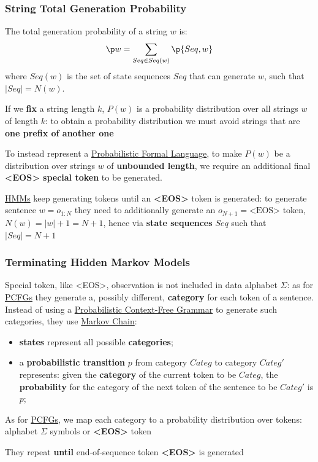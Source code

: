 \subsubsection{String Total Generation Probability}\label{} %
The total generation probability of a string $w$ is:
\[
    \p w = \sum_{Seq\in Seq(w)}\p{Seq,w}
\]
where $Seq(w)$ is the set of state sequences $Seq$ that can generate $w$, such that $|Seq| = N(w)$.
\begin{note}
    If we \textbf{fix} a string length $k$, $P(w)$ is a probability distribution over all strings $w$ of length $k$: to obtain a probability distribution we must avoid strings that are \textbf{one prefix of another one}
\end{note}
To instead represent a \hyperref[def:pfl]{Probabilistic Formal Language}, to make $P(w)$ be a distribution over strings $w$ of \textbf{unbounded length}, we require an additional final \textbf{<EOS> special token} to be generated.
\begin{note}
    \hyperref[sub:lm_hmm]{HMMs} keep generating tokens until an \textbf{<EOS>} token is generated: to generate sentence $w = o_{1:N}$ they need to additionally generate an $o_{N+1} = \text{<EOS>}$ token, $N(w) = |w|+1 = N+1$, hence via \textbf{state sequences} $Seq$ such that $|Seq| = N+1$
\end{note}
%
\subsubsection{Terminating Hidden Markov Models}\label{sub:lm_terminating_hidden_markov_models} %
Special token, like <EOS>, observation is not included in data alphabet $\Sigma$: as for \hyperref[def:pcfg]{PCFGs} they generate a, possibly different, \textbf{category} for each token of a sentence.
Instead of using a \hyperref[def:pcfg]{Probabilistic Context-Free Grammar} to generate such categories, they use \hyperref[def:markov-chain]{Markov Chain}:
\begin{itemize}
    \item \textbf{states} represent all possible \textbf{categories};
    \item a \textbf{probabilistic transition} $p$ from category $Categ$ to category $Categ'$ represents: given the \textbf{category} of the current token to be $Categ$, the \textbf{probability} for the category of the next token of the sentence to be $Categ'$ is $p$;
\end{itemize}
\begin{note}
    As for \hyperref[def:pcfg]{PCFGs}, we map each category to a probability distribution over tokens: alphabet $\Sigma$ symbols or \textbf{<EOS>} token
\end{note}
\begin{critical}
    They repeat \textbf{until} end-of-sequence token \textbf{<EOS>} is generated
\end{critical}
\begin{warning}
\end{warning}
